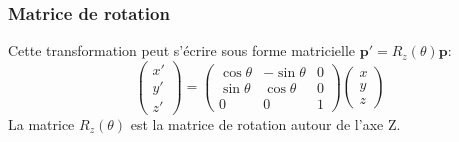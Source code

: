 \subsubsection{Matrice de rotation}
Cette transformation peut s'écrire sous forme matricielle \( \mathbf{p'} = R_z(\theta) \mathbf{p} \):
\[ \begin{pmatrix} x' \\ y' \\ z' \end{pmatrix} = \begin{pmatrix} \cos \theta & -\sin \theta & 0 \\ \sin \theta & \cos \theta & 0 \\ 0 & 0 & 1 \end{pmatrix} \begin{pmatrix} x \\ y \\ z \end{pmatrix} \]
La matrice \( R_z(\theta) \) est la matrice de rotation autour de l'axe Z.
